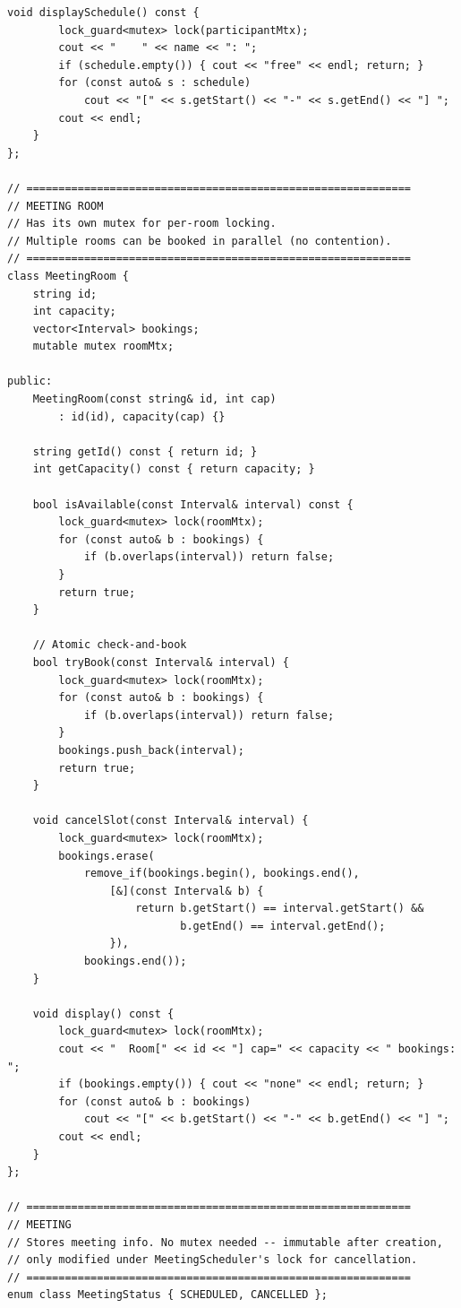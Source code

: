 \documentclass[11pt,a4paper]{article}
\begin{document}
\begin{lstlisting}[title={\texttt{models.hpp}}]
    void displaySchedule() const {
        lock_guard<mutex> lock(participantMtx);
        cout << "    " << name << ": ";
        if (schedule.empty()) { cout << "free" << endl; return; }
        for (const auto& s : schedule)
            cout << "[" << s.getStart() << "-" << s.getEnd() << "] ";
        cout << endl;
    }
};

// ============================================================
// MEETING ROOM
// Has its own mutex for per-room locking.
// Multiple rooms can be booked in parallel (no contention).
// ============================================================
class MeetingRoom {
    string id;
    int capacity;
    vector<Interval> bookings;
    mutable mutex roomMtx;

public:
    MeetingRoom(const string& id, int cap)
        : id(id), capacity(cap) {}

    string getId() const { return id; }
    int getCapacity() const { return capacity; }

    bool isAvailable(const Interval& interval) const {
        lock_guard<mutex> lock(roomMtx);
        for (const auto& b : bookings) {
            if (b.overlaps(interval)) return false;
        }
        return true;
    }

    // Atomic check-and-book
    bool tryBook(const Interval& interval) {
        lock_guard<mutex> lock(roomMtx);
        for (const auto& b : bookings) {
            if (b.overlaps(interval)) return false;
        }
        bookings.push_back(interval);
        return true;
    }

    void cancelSlot(const Interval& interval) {
        lock_guard<mutex> lock(roomMtx);
        bookings.erase(
            remove_if(bookings.begin(), bookings.end(),
                [&](const Interval& b) {
                    return b.getStart() == interval.getStart() &&
                           b.getEnd() == interval.getEnd();
                }),
            bookings.end());
    }

    void display() const {
        lock_guard<mutex> lock(roomMtx);
        cout << "  Room[" << id << "] cap=" << capacity << " bookings: ";
        if (bookings.empty()) { cout << "none" << endl; return; }
        for (const auto& b : bookings)
            cout << "[" << b.getStart() << "-" << b.getEnd() << "] ";
        cout << endl;
    }
};

// ============================================================
// MEETING
// Stores meeting info. No mutex needed -- immutable after creation,
// only modified under MeetingScheduler's lock for cancellation.
// ============================================================
enum class MeetingStatus { SCHEDULED, CANCELLED };


\end{lstlisting}
\end{document}
